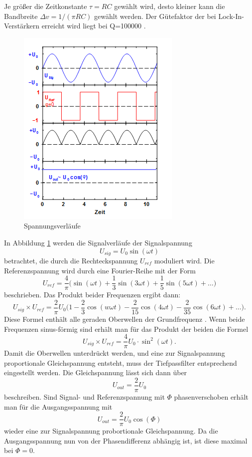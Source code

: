 Je größer die Zeitkonstante $\tau =RC$ gewählt wird, desto kleiner kann die
Bandbreite $\Delta v=1/(\pi RC)$ gewählt werden.
Der Gütefaktor der bei Lock-In-Verstärkern erreicht wird liegt bei Q=100000
\cite{303}.
\newpage
\begin{figure}[h]
  \centering
  \includegraphics{Bilder/Spannung.jpg}
  \caption{Spannungsverläufe}
  \label{fig:spannung}
\end{figure}
In Abbildung \ref{fig:spannung} werden die Signalverläufe der Signalspannung
\begin{equation}
  U_{sig}=U_0\sin(\omega t)
\end{equation}
betrachtet, die durch die Rechteckspannung $U_{ref}$ moduliert wird.
Die Referenzspannung wird durch eine Fourier-Reihe mit der Form
\begin{equation}
  U_{ref}=\frac{4}{\pi}\biggl(\sin(\omega t)+\frac{1}{3}\sin(3\omega t)
  +\frac{1}{5}\sin(5\omega t)+\dots\biggr)
\end{equation}
beschrieben. Das Produkt beider Frequenzen ergibt dann:
\begin{equation}
  U_{sig}\times U_{ref} =\frac{2}{\pi}U_0\biggl(1-\frac{2}{3}\cos(w\omega t)
  -\frac{2}{15}\cos(4\omega t)-\frac{2}{35}\cos(6\omega t)+\dots\biggr).
\end{equation}
Diese Formel enthält alle geraden Oberwellen der Grundfrequenz \omega.
Wenn beide Frequenzen sinus-förmig sind erhält man für das Produkt der beiden
die Formel
\begin{equation}
  U_{sig}\times U_{ref}=\frac{4}{\pi}U_0 \cdot \sin^2(\omega t).
\end{equation}
Damit die Oberwellen unterdrückt werden, und eine zur Signalspannung proportionale
Gleichspannung entsteht, muss der Tiefpassfilter entsprechend eingestellt werden.
Die Gleichspannung lässt sich dann über
\begin{equation}
  U_{out}=\frac{2}{\pi}U_0
\end{equation}
beschreiben.
Sind Signal- und Referenzspannung mit $\Phi$ phasenverschoben erhält man für
die Ausgangsspannung mit
\begin{equation}
  U_{out}=\frac{2}{\pi}U_0\cos(\Phi) \label{eqn:out}
\end{equation}
wieder eine zur Signalspannung probortionale Gleichspannung. Da die Ausgangsspannung
nun von der Phasendifferenz abhängig ist, ist diese maximal bei $\Phi=0$.
